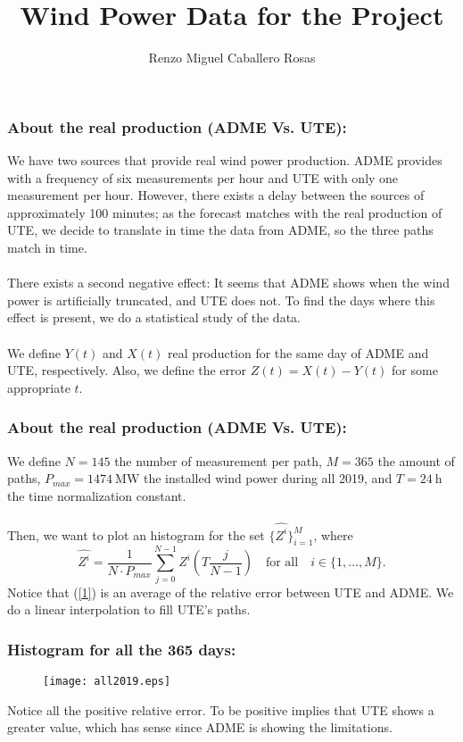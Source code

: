 \documentclass[aspectratio=169]{beamer}\usepackage[utf8]{inputenc}
\title{Wind Power Data for the Project}
\subtitle{Renzo Miguel Caballero Rosas}
\begin{document}
\begin{frame}
\titlepage
\end{frame}

\begin{frame}\frametitle{About the real production (ADME Vs. UTE):}

We have two sources that provide real wind power production. ADME provides with a frequency of six measurements per hour and UTE with only one measurement per hour. However, there exists a delay between the sources of approximately 100 minutes; as the forecast matches with the real production of UTE, we decide to translate in time the data from ADME, so the three paths match in time.\\
\quad\\
There exists a second negative effect: It seems that ADME shows when the wind power is artificially truncated, and UTE does not. To find the days where this effect is present, we do a statistical study of the data.\\
\quad\\
We define $Y(t)$ and $X(t)$ real production for the same day of ADME and UTE, respectively. Also, we define the error $Z(t)=X(t)-Y(t)$ for some appropriate $t$. 

\end{frame}

\begin{frame}\frametitle{About the real production (ADME Vs. UTE):}

We define $N=145$ the number of measurement per path, $M=365$ the amount of paths, $P_{max}=\SI{1474}{\mega\watt}$ the installed wind power during all 2019, and $T=\SI{24}{\hour}$ the time normalization constant.\\
\quad\\
Then, we want to plot an histogram for the set $\{\hat{Z^i}\}_{i=1}^M$, where
\begin{equation}
\hat{Z^i}=\frac{1}{N\cdot P_{max}}\sum_{j=0}^{N-1}Z^i\left(T\frac{j}{N-1}\right)\quad\text{for all}\quad i\in\{1,\dots,M\}.
\label{1}
\end{equation}
Notice that (\ref{1}) is an average of the relative error between UTE and ADME. We do a linear interpolation to fill UTE's paths.

\end{frame}

\begin{frame}\frametitle{Histogram for all the 365 days:}
\begin{figure}[ht!]
\centering
{\texttt{[image: all2019.eps]}}
\end{figure}
\alert{Notice all the positive relative error. To be positive implies that UTE shows a greater value, which has sense since ADME is showing the limitations.}
\end{frame}
\end{document}
